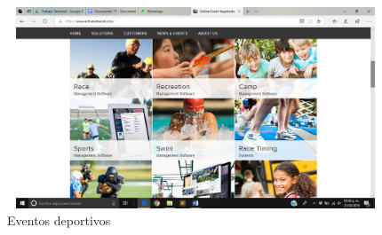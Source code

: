 \pagebreak

\begin{figure}[ht]
	\centering
	\includegraphics[width=12cm, height=6cm]{Imagenes/Aplicaciones/AN2.png}
	\caption{Eventos deportivos}
\end{figure}


